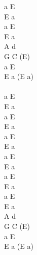 \documentclass[a5paper, 10pt]{book}
\begin{document}
\begin{minipage}[t]{0.2\textwidth}
  a E\\
  E a\\
  a E\\
  E a\\
  A d\\
  G  C (E)\\
  a E\\
  E  a (E a)\\
  \\
  a E\\
  E a\\
  a E\\
  E a\\

  a E\\
  E a\\
  a E\\
  E a\\

  a E\\
  E a\\
  a E\\
  E a\\
  A d\\
  G  C (E)\\
  a E\\
  E  a (E a)\\
\end{minipage}

\newpage
\end{document}
